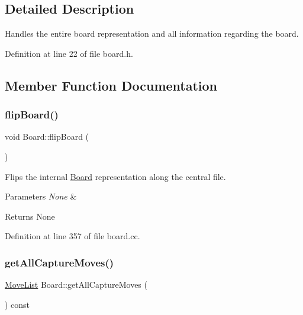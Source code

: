 \subsection{Detailed Description}
Handles the entire board representation and all information regarding the board. 

Definition at line 22 of file board.\+h.



\subsection{Member Function Documentation}
\mbox{\label{classBoard_a6007b1cc2025e26a23e63621f36fee19}} 
\subsubsection{\texorpdfstring{flip\+Board()}{flipBoard()}}
{\footnotesize\ttfamily void Board\+::flip\+Board (\begin{DoxyParamCaption}{ }\end{DoxyParamCaption})\hspace{0.3cm}{\ttfamily [noexcept]}}



Flips the internal \mbox{\hyperlink{classBoard}{Board}} representation along the central file. 


\begin{DoxyParams}{Parameters}
{\em None} & \\
\hline
\end{DoxyParams}
\begin{DoxyReturn}{Returns}
None 
\end{DoxyReturn}


Definition at line 357 of file board.\+cc.

\mbox{\label{classBoard_a884b9114fd749aeec4359fac01eb1db1}} 
\subsubsection{\texorpdfstring{get\+All\+Capture\+Moves()}{getAllCaptureMoves()}}
{\footnotesize\ttfamily \mbox{\hyperlink{classMoveList}{Move\+List}} Board\+::get\+All\+Capture\+Moves (\begin{DoxyParamCaption}{ }\end{DoxyParamCaption}) const\hspace{0.3cm}{\ttfamily [noexcept]}}



